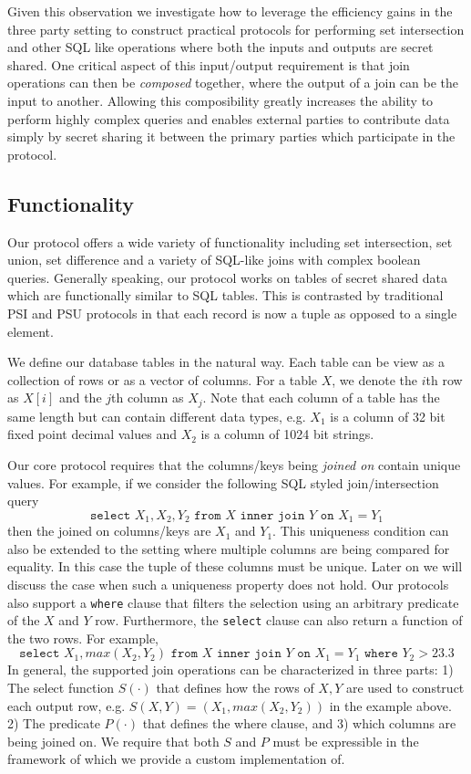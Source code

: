 Given this observation we investigate how to leverage the efficiency gains in the three party setting to construct practical protocols for performing set intersection and other SQL like operations where both the inputs and outputs are secret shared. One critical aspect of this input/output requirement is that join operations can then be \emph{composed} together, where the output of a join can be the input to another. Allowing this composibility greatly increases the ability to perform highly complex queries and enables external parties to contribute data simply by secret sharing it between the primary parties which participate in the protocol.

\subsection{Functionality}

Our protocol offers a wide variety of functionality including set intersection, set union, set difference and a variety of SQL-like joins with complex boolean queries. Generally speaking, our protocol works on tables of secret shared data which are functionally similar to SQL tables. This is contrasted by traditional PSI and PSU protocols\cite{usenix:PSZ14,USENIX:PSSZ15,PSZ16,CCS:KKRT16} in that each record is now a tuple as opposed to a single element. 

We define our database tables in the natural way. Each table can be view as a collection of rows or as a vector of columns. For a table $X$, we denote the $i$th row as $X[i]$ and the $j$th column as $X_j$. Note that each column of a table has the same length but can contain different data types, e.g. $X_1$ is a column of 32 bit fixed point decimal values and $X_2$ is a column of 1024 bit strings.


Our core protocol requires that the columns/keys being \emph{joined on} contain unique values. For example, if we consider the following SQL styled join/intersection query
$$
\texttt{select } X_1, X_2, Y_2 \texttt{ from } X \texttt{ inner join } Y \texttt{ on } X_1 = Y_1
$$
then the joined on columns/keys are $X_1$ and $Y_1$. This uniqueness condition can also be extended to the setting where multiple columns are being compared for equality. In this case the tuple of these columns must be unique. Later on we will discuss the case when such a uniqueness property does not hold. Our protocols also support a \texttt{where} clause that filters the selection using an arbitrary predicate of the $X$ and $Y$ row. Furthermore, the \texttt{select} clause can also return a function of the two rows. For example,
$$
\texttt{select } X_1,max(X_2, Y_2)  \texttt{ from } X \texttt{ inner join } Y \texttt{ on } X_1 = Y_1 \texttt{ where } Y_2 > 23.3
$$
In general, the supported join operations can be characterized in three parts: 1) The select function $S(\cdot)$ that defines how the rows of $X,Y$ are used to construct each output row, e.g. $S(X,Y)=(X_1, max(X_2,Y_2))$ in the example above. 2) The predicate $P(\cdot)$ that defines the where clause, and 3) which columns are being joined on. We require that both $S$ and $P$ must be expressible in the framework of \cite{aby3} which we provide a custom implementation of.

